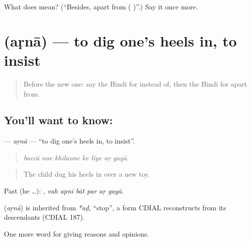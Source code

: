 \begin{tcolorbox}[breakable,colback=teal!4,colframe=teal!35!black,title={Before you move on}]
What does  mean? (\textquotedblleft{}Besides, apart from ( )\textquotedblright{}.) Say it once more.
\end{tcolorbox}
\section[\texorpdfstring{\hi{अड़ना} (aṛnā)}{अड़ना (aṛnā)}]{ (aṛnā) — to dig one's heels in, to insist}

\label{lesson:HI-C371-arna}



\begin{quote}
Before the new one: say the Hindi for instead of, then the Hindi for apart from.
\end{quote}

\subsection*{You'll want to know: }
\textbf{} — \emph{aṛnā} — \textquotedblleft{}to dig one's heels in, to insist\textquotedblright{}.

\begin{quote}
      
\end{quote}

\begin{quote}
\emph{baccā nae khilaune ke liye aṛ gayā.}
\end{quote}

\begin{quote}
The child dug his heels in over a new toy.
\end{quote}

Past (he …):      , \emph{vah apnī bāt par aṛ gayā}.

\begin{cousinweb}
\textbf{} (\emph{aṛnā}) is inherited from \emph{*aḍ}, \textquotedblleft{}stop\textquotedblright{}, a form CDIAL reconstructs from its descendants (CDIAL 187).
\end{cousinweb}

\begin{grammarlens}[title={What you've built}]
One more word for giving reasons and opinions.
\end{grammarlens}

